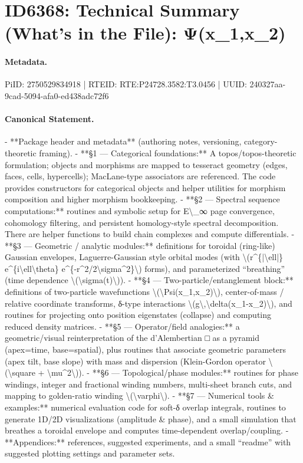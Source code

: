 \section*{ID6368: Technical Summary (What’s in the File): Ψ(x\_1,x\_2)}
\paragraph{Metadata.}
PiID: 2750529834918 | RTEID: RTE:P24728.3582:T3.0456 | UUID: 240327aa-9cad-5094-afa0-ed438adc72f6

\paragraph{Canonical Statement.}
- **Package header and metadata** (authoring notes, versioning, category-theoretic framing). - **§1 — Categorical foundations:** A topos/topos-theoretic formulation; objects and morphisms are mapped to tesseract geometry (edges, faces, cells, hypercells); MacLane-type associators are referenced. The code provides constructors for categorical objects and helper utilities for morphism composition and higher morphism bookkeeping. - **§2 — Spectral sequence computations:** routines and symbolic setup for E\textbackslash{}\_∞ page convergence, cohomology filtering, and persistent homology-style spectral decomposition. There are helper functions to build chain complexes and compute differentials. - **§3 — Geometric / analytic modules:** definitions for toroidal (ring-like) Gaussian envelopes, Laguerre-Gaussian style orbital modes (with \textbackslash{}(r\textasciicircum{}\{|\textbackslash{}ell|\} e\textasciicircum{}\{i\textbackslash{}ell\textbackslash{}theta\} e\textasciicircum{}\{-r\textasciicircum{}2/2\textbackslash{}sigma\textasciicircum{}2\}\textbackslash{}) forms), and parameterized “breathing” (time dependence \textbackslash{}(\textbackslash{}sigma(t)\textbackslash{})). - **§4 — Two-particle/entanglement block:** definitions of two-particle wavefunctions \textbackslash{}(\textbackslash{}Psi(x\_1,x\_2)\textbackslash{}), center-of-mass / relative coordinate transforms, δ-type interactions \textbackslash{}(g\textbackslash{},\textbackslash{}delta(x\_1-x\_2)\textbackslash{}), and routines for projecting onto position eigenstates (collapse) and computing reduced density matrices. - **§5 — Operator/field analogies:** a geometric/visual reinterpretation of the d’Alembertian □ as a pyramid (apex=time, base=spatial), plus routines that associate geometric parameters (apex tilt, base slope) with mass and dispersion (Klein-Gordon operator \textbackslash{}(\textbackslash{}square + \textbackslash{}mu\textasciicircum{}2\textbackslash{})). - **§6 — Topological/phase modules:** routines for phase windings, integer and fractional winding numbers, multi-sheet branch cuts, and mapping to golden-ratio winding \textbackslash{}(\textbackslash{}varphi\textbackslash{}). - **§7 — Numerical tools \& examples:** numerical evaluation code for soft-δ overlap integrals, routines to generate 1D/2D visualizations (amplitude \& phase), and a small simulation that breathes a toroidal envelope and computes time-dependent overlap/coupling. - **Appendices:** references, suggested experiments, and a small “readme” with suggested plotting settings and parameter sets.

